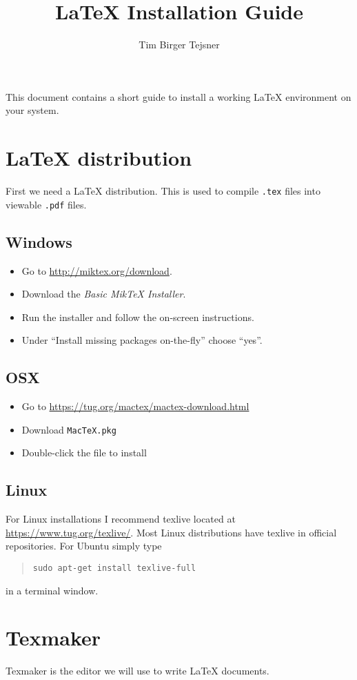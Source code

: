 \documentclass[oneside, a4paper]{memoir}
\title{\LaTeX{} Installation Guide}
\author{Tim Birger Tejsner}
\begin{document}
\maketitle

This document contains a short guide to install a working \LaTeX{} environment on your system. 

\section{\LaTeX{} distribution}
First we need a \LaTeX{} distribution. This is used to compile \texttt{.tex} files into viewable \texttt{.pdf} files.

\subsection{Windows}
\begin{itemize}
\item Go to \url{http://miktex.org/download}.
\item Download the \emph{Basic MikTeX Installer}.
\item Run the installer and follow the on-screen instructions.
\item Under \enquote{Install missing packages on-the-fly} choose \enquote{yes}.
\end{itemize}

\subsection{OSX}
\begin{itemize}
\item Go to \url{https://tug.org/mactex/mactex-download.html}
\item Download \texttt{MacTeX.pkg}
\item Double-click the file to install
\end{itemize}

\subsection{Linux}
For Linux installations I recommend texlive located at \url{https://www.tug.org/texlive/}. Most Linux distributions have texlive in official repositories. For Ubuntu simply type 
\begin{quote}
\texttt{sudo apt-get install texlive-full}
\end{quote}
in a terminal window.


\section{Texmaker}
Texmaker is the editor we will use to write \LaTeX{} documents.
\end{document}
